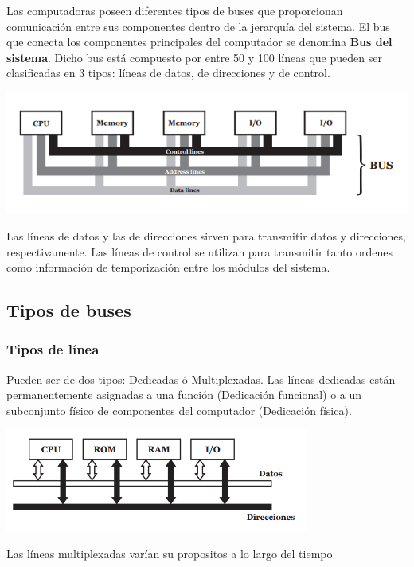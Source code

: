 Las computadoras poseen diferentes tipos de buses que proporcionan comunicación entre sus componentes dentro de la jerarquía del sistema. El bus que conecta los componentes principales del computador se denomina \textbf{Bus del sistema}. Dicho bus está compuesto por entre 50 y 100 líneas que pueden ser clasificadas en 3 tipos: líneas de datos, de direcciones y de control.

\begin{center}
	\includegraphics[width=15cm, keepaspectratio=yes]{imagenes/bus_sis.png}
\end{center}

Las líneas de datos y las de direcciones sirven para transmitir datos y direcciones, respectivamente. Las líneas de control se utilizan para transmitir tanto ordenes como información de temporización entre los módulos del sistema.

\subsection{Tipos de buses}
\subsubsection{Tipos de línea}
Pueden ser de dos tipos: Dedicadas ó Multiplexadas.
Las líneas dedicadas están permanentemente asignadas a una función (Dedicación funcional) o a un subconjunto físico de componentes del computador (Dedicación física).

\begin{center}
	\includegraphics[width=10cm, keepaspectratio=yes]{imagenes/bus_dedicado.PNG}
\end{center}

Las líneas multiplexadas varían su propositos a lo largo del tiempo

